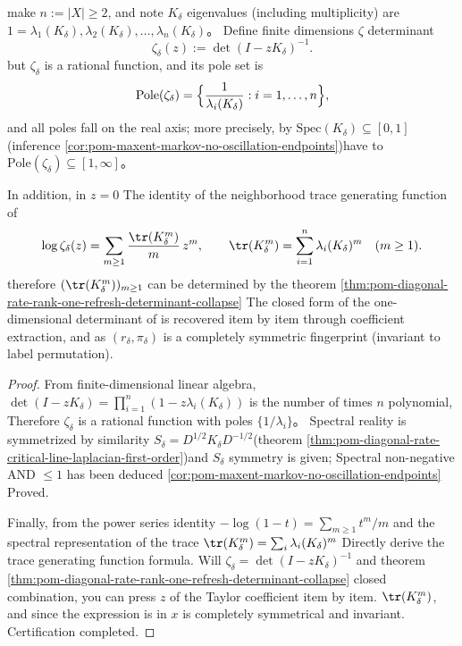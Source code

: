 \begin{corollary}\label{cor:pom-diagonal-rate-rank-one-refresh-trace-zeta-fingerprint}
make \(n:=|X|\ge 2\), and note \(K_\delta\) eigenvalues ​​(including multiplicity) are
\(
1=\lambda_1(K_\delta),\lambda_2(K_\delta),\dots,\lambda_n(K_\delta)
\)。
Define finite dimensions \(\zeta\) determinant
\[
\zeta_\delta(z):=\det(I-zK_\delta)^{-1}.
\]
but \(\zeta_\delta\) is a rational function, and its pole set is
\[
\mathrm{Pole}(\zeta_\delta)=\Bigl\{\frac{1}{\lambda_i(K_\delta)}:i=1,\dots,n\Bigr\},
\]
and all poles fall on the real axis; more precisely, by \(\mathrm{Spec}(K_\delta)\subseteq[0,1]\)(inference \ref{cor:pom-maxent-markov-no-oscillation-endpoints})have to
\(
\mathrm{Pole}(\zeta_\delta)\subseteq [1,\infty]
\)。
\par
In addition, in \(z=0\) The identity of the neighborhood trace generating function of
\[
\log \zeta_\delta(z)=\sum_{m\ge 1}\frac{\tr(K_\delta^m)}{m}\,z^m,
\qquad
\tr(K_\delta^m)=\sum_{i=1}^{n}\lambda_i(K_\delta)^m\quad(m\ge 1).
\]
therefore \((\tr(K_\delta^m))_{m\ge 1}\) can be determined by the theorem \ref{thm:pom-diagonal-rate-rank-one-refresh-determinant-collapse} The closed form of the one-dimensional determinant of is recovered item by item through coefficient extraction,
and as \((r_\delta,\pi_\delta)\) is a completely symmetric fingerprint (invariant to label permutation).
\end{corollary}
\begin{proof}
From finite-dimensional linear algebra,\(\det(I-zK_\delta)=\prod_{i=1}^{n}(1-z\lambda_i(K_\delta))\) is the number of times \(n\) polynomial,
Therefore \(\zeta_\delta\) is a rational function with poles \(\{1/\lambda_i\}\)。
Spectral reality is symmetrized by similarity \(S_\delta=D^{1/2}K_\delta D^{-1/2}\)(theorem \ref{thm:pom-diagonal-rate-critical-line-laplacian-first-order})and \(S_\delta\) symmetry is given;
Spectral non-negative AND \(\le 1\) has been deduced \ref{cor:pom-maxent-markov-no-oscillation-endpoints} Proved.
\par
Finally, from the power series identity \(-\log(1-t)=\sum_{m\ge 1}t^m/m\) and the spectral representation of the trace
\(
\tr(K_\delta^m)=\sum_i \lambda_i(K_\delta)^m
\)
Directly derive the trace generating function formula.
Will \(\zeta_\delta=\det(I-zK_\delta)^{-1}\) and theorem \ref{thm:pom-diagonal-rate-rank-one-refresh-determinant-collapse} closed combination, you can press \(z\) of the Taylor coefficient item by item. \(\tr(K_\delta^m)\), and since the expression is in \(x\) is completely symmetrical and invariant. Certification completed.
\end{proof}

